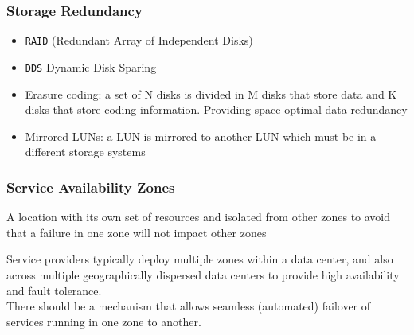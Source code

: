 \subsubsection{Storage Redundancy}

\begin{itemize}
   \item \texttt{RAID} (Redundant Array of Independent Disks)
   \item \texttt{DDS} Dynamic Disk Sparing
   \item Erasure coding: a set of N disks is divided in M disks that store data
   and K disks that store coding information. Providing space-optimal data redundancy
   \item Mirrored LUNs: a LUN is mirrored to another LUN which must be in a different storage systems
\end{itemize}


\subsubsection{Service Availability Zones}

\begin{definition}
   A location with its own set of resources and isolated from other zones to avoid that a failure in one zone will not impact other zones
\end{definition}

Service providers typically deploy multiple zones within a data center, and also across multiple geographically dispersed data centers to provide high availability and fault tolerance.\\
There should be a mechanism that allows seamless (automated) failover of services
running in one zone to another.

